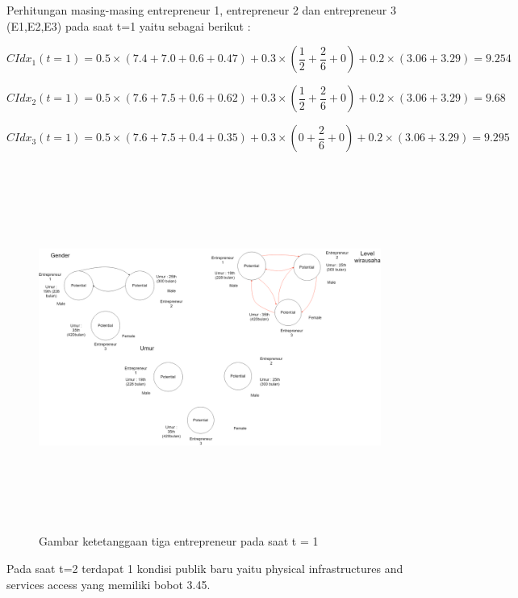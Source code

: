 Perhitungan masing-masing entrepreneur 1, entrepreneur 2 dan entrepreneur 3 (E1,E2,E3) pada saat t=1 yaitu sebagai berikut :

\begin{equation}
	CIdx_{1}(t=1) = 0.5 \times (7.4 + 7.0 + 0.6 + 0.47) + 0.3 \times (\frac {1} {2} + \frac {2} {6}  + 0) + 0.2 \times (3.06 + 3.29) = 9.254
\end{equation}

\begin{equation}
	CIdx_{2}(t=1) = 0.5 \times (7.6 + 7.5 + 0.6 + 0.62) + 0.3 \times (\frac {1} {2} + \frac {2} {6} + 0) + 0.2 \times (3.06 + 3.29) = 9.68
\end{equation}

\begin{equation}
	CIdx_{3}(t=1) = 0.5 \times (7.6 + 7.5 + 0.4 + 0.35) + 0.3 \times (0 + \frac {2} {6} + 0) + 0.2 \times (3.06 + 3.29) = 9.295
\end{equation}

	\begin{figure} [H]
		\centering  
		\includegraphics[width=18cm, height=12cm]{gambarwirausaha(t=1)} 
		\caption[Gambar ketetanggaan tiga entrepreneur pada saat t = 1]{Gambar ketetanggaan tiga entrepreneur pada saat t = 1} 
		\label{fig:t0} 
	\end{figure}

Pada saat t=2 terdapat 1 kondisi publik baru yaitu physical infrastructures and services access yang memiliki bobot 3.45.



